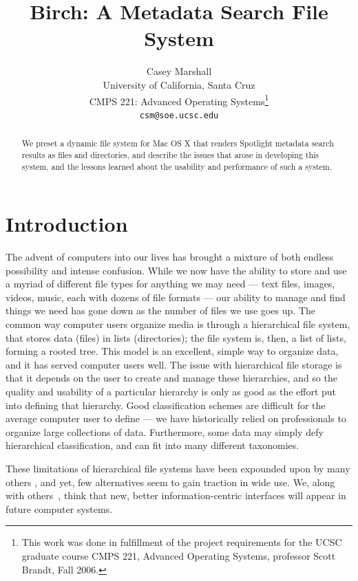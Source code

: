 \documentclass{article}
\begin{document}
\title{Birch: A Metadata Search File System}
\author{Casey Marshall \\
  University of California, Santa Cruz \\
  CMPS 221: Advanced Operating Systems\footnote{This work was done in
    fulfillment of the project requirements for the UCSC graduate
    course CMPS 221, Advanced Operating Systems, professor Scott
    Brandt, Fall 2006.} \\
  \texttt{csm@soe.ucsc.edu}}
\maketitle

\begin{abstract}
  We preset a dynamic file system for Mac OS X that renders Spotlight
  metadata search results as files and directories, and describe the
  issues that arose in developing this system, and the lessons learned
  about the usability and performance of such a system.
\end{abstract}

\section{Introduction}
The advent of computers into our lives has brought a mixture of both
endless possibility and intense confusion. While we now have the
ability to store and use a myriad of different file types for anything
we may need --- text files, images, videos, music, each with dozens of
file formats --- our ability to manage and find things we need has
gone down as the number of files we use goes up. The common way
computer users organize media is through a hierarchical file system,
that stores data (files) in lists (directories); the file system is,
then, a list of lists, forming a rooted tree. This model is an
excellent, simple way to organize data, and it has served computer
users well. The issue with hierarchical file storage is that it
depends on the user to create and manage these hierarchies, and so the
quality and usability of a particular hierarchy is only as good as the
effort put into defining that hierarchy. Good classification schemes
are difficult for the average computer user to define --- we have
historically relied on professionals to organize large collections of
data. Furthermore, some data may simply defy hierarchical
classification, and can fit into many different taxonomies.

These limitations of hierarchical file systems have been expounded
upon by many others \cite{OToole:1992, Nielsen:1996, Gorter:2004,
  Nickell:2006}, and yet, few alternatives seem to gain traction in
wide use.  We, along with others~\cite{Veda:2005}, think that new,
better information-centric interfaces will appear in future computer
systems.
\end{document}
